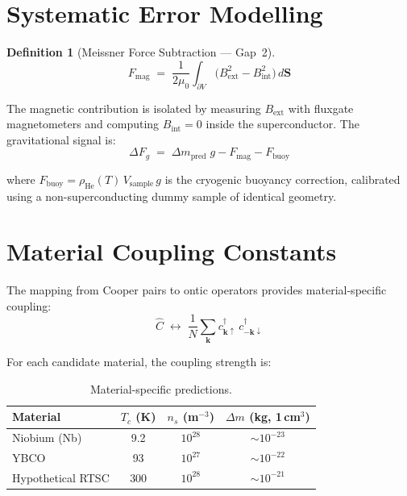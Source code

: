 \documentclass[11pt,a4paper]{article}
\newtheorem{definition}{Definition}[section]
\theoremstyle{remark}
\newcommand{\Cop}{\hat{C}}
\begin{document}
\section{Systematic Error Modelling}
\label{sec:systematic}

\begin{definition}[Meissner Force Subtraction --- Gap~2]
\begin{equation}\label{eq:meissner}
    F_{\text{mag}} \;=\; \frac{1}{2\mu_0}\!\int_{\partial V}
        \!\bigl(B_{\text{ext}}^2 - B_{\text{int}}^2\bigr)\, d\mathbf{S}
\end{equation}
\end{definition}

The magnetic contribution is isolated by measuring $B_{\text{ext}}$ with fluxgate magnetometers and computing $B_{\text{int}} = 0$ inside the superconductor.  The gravitational signal is:
\begin{equation}\label{eq:gravsignal}
    \Delta F_g \;=\; \Delta m_{\text{pred}}\; g - F_{\text{mag}} - F_{\text{buoy}}
\end{equation}

where $F_{\text{buoy}} = \rho_{\text{He}}(T)\,V_{\text{sample}}\,g$ is the cryogenic buoyancy correction, calibrated using a non-superconducting dummy sample of identical geometry.

\section{Material Coupling Constants}
\label{sec:coupling}

The mapping from Cooper pairs to ontic operators provides material-specific coupling:
\begin{equation}\label{eq:coupling}
    \Cop \;\longleftrightarrow\; \frac{1}{N}\sum_{\mathbf{k}}
        c_{\mathbf{k}\uparrow}^\dagger\, c_{-\mathbf{k}\downarrow}^\dagger
\end{equation}

For each candidate material, the coupling strength is:
\begin{table}[h]
\centering
\begin{tabular}{@{}lccc@{}}
\toprule
\textbf{Material} & $T_c$ (K) & $n_s$ (m$^{-3}$) & $\Delta m$ (kg, 1\,cm$^3$) \\
\midrule
Niobium (Nb) & 9.2 & $10^{28}$ & $\sim 10^{-23}$ \\
YBCO & 93 & $10^{27}$ & $\sim 10^{-22}$ \\
Hypothetical RTSC & 300 & $10^{28}$ & $\sim 10^{-21}$ \\
\bottomrule
\end{tabular}
\caption{Material-specific predictions.}
\label{tab:materials}
\end{table}
\end{document}
